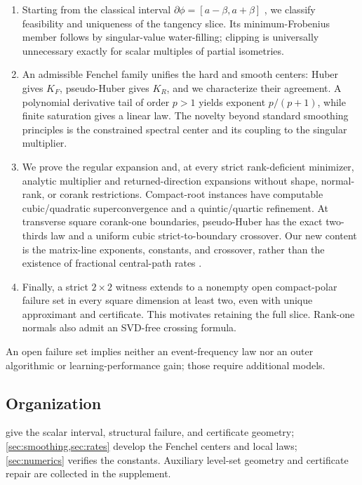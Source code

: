 \begin{enumerate}
 \item Starting from the classical interval
 \(\partial\phi=[a-\beta,a+\beta]\)
 \citep{watson1992subdifferential,lewis1995convex}, we classify feasibility
 and uniqueness of the tangency slice.  Its minimum-Frobenius member follows
 by singular-value water-filling; clipping is universally unnecessary exactly
 for scalar multiples of partial isometries.

 \item An admissible Fenchel family unifies the hard and smooth centers:
 Huber gives \(K_F\), pseudo-Huber gives \(K_R\), and we characterize their
 agreement.  A polynomial derivative tail of order \(p>1\) yields exponent
 \(p/(p+1)\), while finite saturation gives a linear law.  The novelty beyond
 standard smoothing principles
 \citep{nesterov2005smooth,lobos2025smooth,attouch1984variational} is the
 constrained spectral center and its coupling to the singular multiplier.

 \item We prove the regular expansion and, at every strict rank-deficient
 minimizer, analytic multiplier and returned-direction expansions without
 shape, normal-rank, or corank restrictions.  Compact-root instances have
 computable cubic/quadratic superconvergence and a quintic/quartic refinement.
 At transverse square corank-one boundaries, pseudo-Huber has the exact
 two-thirds law and a uniform cubic strict-to-boundary crossover.  Our new
 content is the matrix-line exponents, constants, and crossover, rather than
 the existence of fractional central-path rates \citep{basu2022central}.

 \item Finally, a strict \(2\times2\) witness extends to a nonempty open
 compact-polar failure set in every square dimension at least two, even with
 unique approximant and certificate.  This motivates retaining the full
 slice.  Rank-one normals also admit an SVD-free crossing formula.
\end{enumerate}

An open failure set implies neither an event-frequency law nor an outer
algorithmic or learning-performance gain; those require additional models.

\subsection{Organization}

 give the scalar interval, structural failure,
and certificate geometry; \cref{sec:smoothing,sec:rates} develop the Fenchel
centers and local laws; \cref{sec:numerics} verifies the constants.  Auxiliary
level-set geometry and certificate repair are collected in the supplement.
